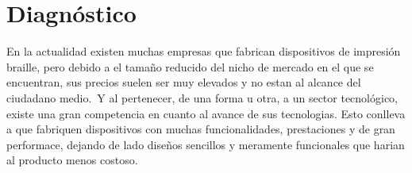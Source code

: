 \chapter{Diagn\'ostico}




En la actualidad existen muchas empresas que fabrican dispositivos de
impresi\'on braille, pero debido a el tama\~no reducido del nicho de mercado
en el que se encuentran, sus precios suelen ser muy elevados y no estan al
alcance del ciudadano medio.\ Y al pertenecer, de una forma u otra, a un sector
tecnol\'ogico, existe una gran competencia en cuanto al avance de sus
tecnologias. Esto conlleva a que fabriquen dispositivos con muchas
funcionalidades, prestaciones y de gran performace, dejando de lado dise\~nos
sencillos y meramente funcionales que harian al producto menos costoso.
